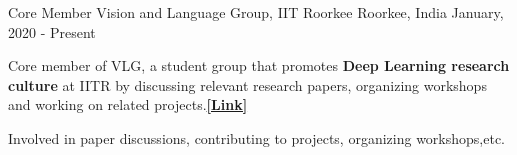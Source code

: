 

\begin{cventries}

  \cventry
    {Core Member} %
    {Vision and Language Group, IIT Roorkee} %
    {Roorkee, India} %
    {January, 2020 - Present} %
    {
      \begin{cvitems} %
        \item {Core member of VLG, a student group that promotes \textbf{Deep Learning research culture} at IITR by discussing relevant research papers, organizing workshops and working on related projects.\href{https://vlgiitr.github.io/}{\bf [Link]}}
        \item {Involved in paper discussions, contributing to projects, organizing workshops,etc.}
      \end{cvitems}
    }
\end{cventries}
